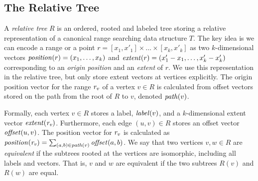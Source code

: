 \subsection{The Relative Tree}
A \emph{relative tree} $R$ is an ordered, rooted and labeled tree storing a relative representation of a canonical range searching data structure $T$. The key idea is we can encode a range or a point $r = [ x_1, x'_1 ] \times \ldots \times [ x_k, x'_k ]$ as two $k$-dimensional vectors $\mathit{position}(r) = (x_1, \ldots, x_k)$ and $\mathit{extent}(r) = (x'_1 - x_1, \ldots, x'_k - x'_k)$ corresponding to an \emph{origin position} and an \emph{extent} of $r$. We use this representation in the relative tree, but only store extent vectors at vertices explicitly. The origin position vector for the range $\mathit{r_{v}}$ of a vertex $v \in R$ is calculated from offset vectors stored on the path from the root of $R$ to $v$, denoted $\mathit{path}(v)$. 

Formally, each vertex $v \in R$ stores a label, $\mathit{label}(v)$, and a $k$-dimensional extent vector $\mathit{extent}(\mathit{r_{v}})$. Furthermore, each edge $(u, v) \in R$ stores an offset vector $\mathit{offset}(u, v)$. The position vector for $\mathit{r_{v}}$ is calculated as $\mathit{position}(\mathit{r_{v}}) = \sum_{(a, b) \in \mathit{path}(v)} \mathit{offset}(a, b)$.
We say that two vertices $v, w \in R$ are \emph{equivalent} if the subtrees rooted at the vertices are isomorphic, including all labels and vectors. That is, $v$ and $w$ are equivalent if the two subtrees $R(v)$ and $R(w)$ are equal. 

